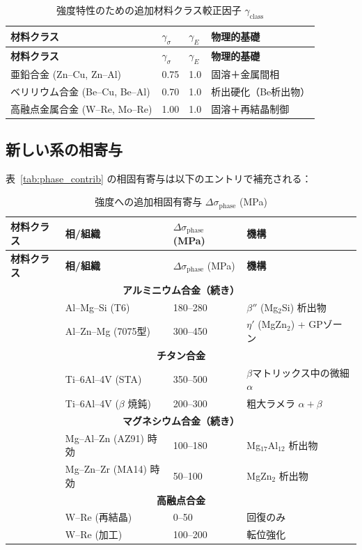 \documentclass[12pt,a4paper]{article}
\begin{document}
	\begin{longtable}{p{3.5cm} p{2.5cm} p{2.5cm} p{5cm}}
		\caption{強度特性のための追加材料クラス較正因子 $\gamma_{\text{class}}$}\label{tab:gamma_class_extended}\\
		\toprule
		\textbf{材料クラス} & $\gamma_{\sigma}$ & $\gamma_{E}$ & \textbf{物理的基礎} \\
		\midrule
		\endfirsthead
		\toprule
		\textbf{材料クラス} & $\gamma_{\sigma}$ & $\gamma_{E}$ & \textbf{物理的基礎} \\
		\midrule
		\endhead
		亜鉛合金 (Zn–Cu, Zn–Al) & 0.75 & 1.0 & 固溶＋金属間相 \\
		ベリリウム合金 (Be–Cu, Be–Al) & 0.70 & 1.0 & 析出硬化（Be析出物） \\
		高融点金属合金 (W–Re, Mo–Re) & 1.00 & 1.0 & 固溶＋再結晶制御 \\
		\bottomrule
	\end{longtable}
	
	\subsection*{新しい系の相寄与}
	表~\ref{tab:phase_contrib} の相固有寄与は以下のエントリで補充される：
	
	\begin{longtable}{p{3.5cm} p{3.0cm} p{3.0cm} p{4cm}}
		\caption{強度への追加相固有寄与 $\Delta\sigma_{\text{phase}}$ (MPa)}\label{tab:phase_contrib_extended}\\
		\toprule
		\textbf{材料クラス} & \textbf{相/組織} & $\Delta\sigma_{\text{phase}}$ (MPa) & \textbf{機構} \\
		\midrule
		\endfirsthead
		\toprule
		\textbf{材料クラス} & \textbf{相/組織} & $\Delta\sigma_{\text{phase}}$ (MPa) & \textbf{機構} \\
		\midrule
		\endhead
		\multicolumn{4}{c}{\textbf{アルミニウム合金（続き）}} \\
		& Al–Mg–Si (T6) & 180–280 & $\beta''$ (Mg$_2$Si) 析出物 \\
		& Al–Zn–Mg (7075型) & 300–450 & $\eta'$ (MgZn$_2$) + GPゾーン \\
		\hline
		\multicolumn{4}{c}{\textbf{チタン合金}} \\
		& Ti–6Al–4V (STA) & 350–500 & $\beta$マトリックス中の微細 $\alpha$ \\
		& Ti–6Al–4V ($\beta$ 焼鈍) & 200–300 & 粗大ラメラ $\alpha+\beta$ \\
		\hline
		\multicolumn{4}{c}{\textbf{マグネシウム合金（続き）}} \\
		& Mg–Al–Zn (AZ91) 時効 & 100–180 & Mg$_{17}$Al$_{12}$ 析出物 \\
		& Mg–Zn–Zr (MA14) 時効 & 50–100 & MgZn$_2$ 析出物 \\
		\hline
		\multicolumn{4}{c}{\textbf{高融点合金}} \\
		& W–Re (再結晶) & 0–50 & 回復のみ \\
		& W–Re (加工) & 100–200 & 転位強化 \\
		\bottomrule
	\end{longtable}
	
\end{document}
